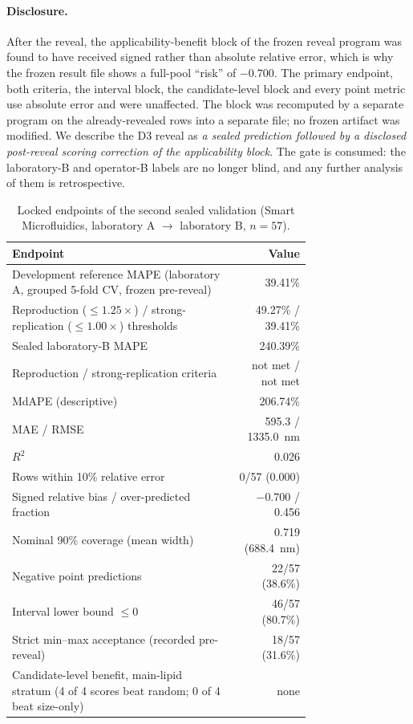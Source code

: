 \documentclass[11pt,a4paper]{article}
\begin{document}
\paragraph{Disclosure.} After the reveal, the applicability-benefit block of
the frozen reveal program was found to have received signed rather than
absolute relative error, which is why the frozen result file shows a
full-pool ``risk'' of $-0.700$. The primary endpoint, both criteria, the
interval block, the candidate-level block and every point metric use absolute
error and were unaffected. The block was recomputed by a separate program on
the already-revealed rows into a separate file; no frozen artifact was
modified. We describe the D3 reveal as \emph{a sealed prediction followed by
a disclosed post-reveal scoring correction of the applicability block}. The
gate is consumed: the laboratory-B and operator-B labels are no longer blind,
and any further analysis of them is retrospective.

\begin{table}[t]
\centering\small
\caption{Locked endpoints of the second sealed validation (Smart
Microfluidics, laboratory A $\to$ laboratory B, $n=57$).}
\label{tab:d3}
\begin{tabular}{p{0.74\linewidth}r}
\toprule
Endpoint & Value \\
\midrule
Development reference MAPE (laboratory A, grouped 5-fold CV, frozen pre-reveal) & 39.41\% \\
Reproduction ($\le 1.25\times$) / strong-replication ($\le 1.00\times$) thresholds & 49.27\% / 39.41\% \\
Sealed laboratory-B MAPE & 240.39\% \\
Reproduction / strong-replication criteria & not met / not met \\
MdAPE (descriptive) & 206.74\% \\
MAE / RMSE & 595.3 / 1335.0~nm \\
$R^2$ & 0.026 \\
Rows within 10\% relative error & 0/57 (0.000) \\
Signed relative bias / over-predicted fraction & $-0.700$ / 0.456 \\
Nominal 90\% coverage (mean width) & 0.719 (688.4~nm) \\
Negative point predictions & 22/57 (38.6\%) \\
Interval lower bound $\le 0$ & 46/57 (80.7\%) \\
Strict min--max acceptance (recorded pre-reveal) & 18/57 (31.6\%) \\
Candidate-level benefit, main-lipid stratum (4 of 4 scores beat random; 0 of 4 beat size-only) & none \\
\bottomrule
\end{tabular}
\end{table}
\end{document}
